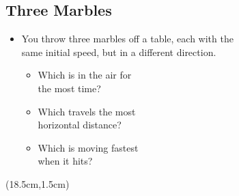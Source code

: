 \documentclass[]{article}
\begin{document}
\newpage
\begin{TeacherMargin}

\end{TeacherMargin}
\begin{PresentSpace}
\vspace{-10pt}
\section*{Three Marbles}
\vspace{-10pt}
\begin{itemize}
	\item You throw three marbles off a table, each with the \\
	same initial speed, but in a different direction.
	\begin{itemize}
		\item Which is in the air for \\
		the most time?
		\item Which travels the most \\
		horizontal distance?
		\item Which is moving fastest \\
		when it hits?
	\end{itemize}
\end{itemize}
\end{PresentSpace}
\begin{textblock*}{10cm}(18.5cm,1.5cm)
\Large
{}
\end{textblock*}
\newpage
\end{document}
